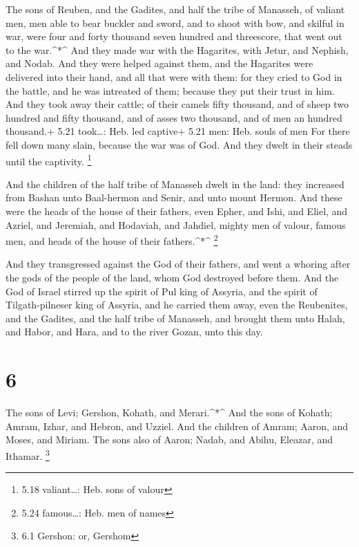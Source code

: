  The sons of Reuben, and the Gadites, and half the tribe of
Manasseh, of valiant men, men able to bear buckler and sword, and to
shoot with bow, and skilful in war, were four and forty thousand seven
hundred and threescore, that went out to the war.\^{}*\^{} 
And they made war with the Hagarites, with Jetur, and Nephish, and
Nodab.  And they were helped against them, and the
Hagarites were delivered into their hand, and all that were with them:
for they cried to God in the battle, and he was intreated of them;
because they put their trust in him.  And they took away
their cattle; of their camels fifty thousand, and of sheep two hundred
and fifty thousand, and of asses two thousand, and of men an hundred
thousand.+ 5.21 took\ldots: Heb. led captive+ 5.21 men: Heb. souls of
men  For there fell down many slain, because the war was of
God. And they dwelt in their steads until the captivity. \footnote{5.18
  valiant\ldots: Heb. sons of valour}

 And the children of the half tribe of Manasseh dwelt in
the land: they increased from Bashan unto Baal-hermon and Senir, and
unto mount Hermon.  And these were the heads of the house
of their fathers, even Epher, and Ishi, and Eliel, and Azriel, and
Jeremiah, and Hodaviah, and Jahdiel, mighty men of valour, famous men,
and heads of the house of their fathers.\^{}*\^{} \footnote{5.24
  famous\ldots: Heb. men of names}

 And they transgressed against the God of their fathers,
and went a whoring after the gods of the people of the land, whom God
destroyed before them.  And the God of Israel stirred up
the spirit of Pul king of Assyria, and the spirit of Tilgath-pilneser
king of Assyria, and he carried them away, even the Reubenites, and the
Gadites, and the half tribe of Manasseh, and brought them unto Halah,
and Habor, and Hara, and to the river Gozan, unto this day.

\hypertarget{section-5}{%
\section{6}\label{section-5}}

 The sons of Levi; Gershon, Kohath, and Merari.\^{}*\^{}
 And the sons of Kohath; Amram, Izhar, and Hebron, and
Uzziel.  And the children of Amram; Aaron, and Moses, and
Miriam. The sons also of Aaron; Nadab, and Abihu, Eleazar, and Ithamar.
\footnote{6.1 Gershon: or, Gershom}

